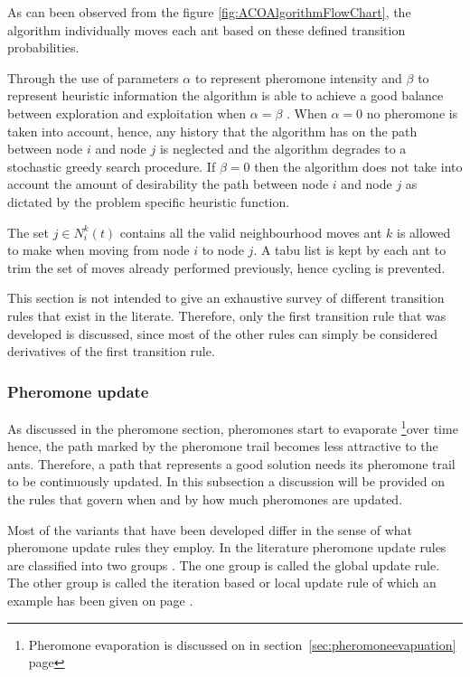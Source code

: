 As can been observed from the figure \ref{fig:ACOAlgorithmFlowChart}, the algorithm individually moves each ant based on these defined transition probabilities.

Through the use of parameters $\alpha$ to represent pheromone intensity and $\beta$ to represent heuristic information the algorithm is able to achieve a good balance between exploration and exploitation when $\alpha=\beta$ \cite{CompuIntelligenceIntro,ACOLargeProblem,AntQAP,FundamentalSwarm}. When $\alpha = 0$ no pheromone is taken into account, hence, any history that the algorithm has on the path between node $i$ and node $j$ is neglected and the algorithm degrades to a stochastic greedy search procedure. If $\beta = 0$ then the algorithm does not take into account the amount of desirability the path between node $i$ and node $j$ as dictated by the problem specific heuristic function.

The set $j \in N^k_i(t)$ contains all the valid neighbourhood moves ant $k$ is allowed to make when moving from node $i$ to node $j$. A tabu list is kept by each ant to trim the set of moves already performed previously, hence cycling is prevented.

This section is not intended to give an exhaustive survey of different transition rules that exist in the literate. Therefore, only the first transition rule that was developed is discussed, since most of the other rules can simply be considered derivatives of the first transition rule.
\subsubsection{Pheromone update}
As discussed in the pheromone section, pheromones start to evaporate \footnote{Pheromone evaporation is discussed on in section~\ref{sec:pheromoneevapuation} page \pageref{sec:pheromoneevapuation}}over time hence, the path marked by the pheromone trail becomes less attractive to the ants. Therefore, a path that represents a good solution needs its pheromone trail to be continuously updated. In this subsection a discussion will be provided on the rules that govern when and by how much pheromones are updated.

 Most of the variants that have been developed differ in the sense of what pheromone update rules they employ. In the literature pheromone update rules are classified into two groups \cite{CompuIntelligenceIntro}. The one group is called the global update rule. The other group is called the iteration based or local update rule of which an example has been given on page \pageref{def:localpheromoneupdate} \cite{CompuIntelligenceIntro}. 

